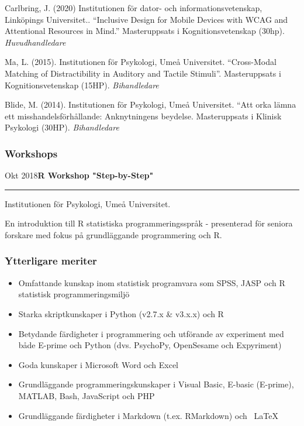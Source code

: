 \documentclass[]{article}
\providecommand{\tightlist}{%
  \setlength{\itemsep}{0pt}\setlength{\parskip}{0pt}}
\begin{document}
Carlbring, J. (2020) Institutionen för dator- och informationsvetenskap,
Linköpings Universitet.. ``Inclusive Design for Mobile Devices with WCAG
and Attentional Resources in Mind.'' Masteruppsats i Kognitionsvetenskap
(30hp). \emph{Huvudhandledare}

Ma, L. (2015). Institutionen för Psykologi, Umeå Universitet.
``Cross-Modal Matching of Distractibility in Auditory and Tactile
Stimuli''. Masteruppsats i Kognitionsvetenskap (15HP).
\emph{Bihandledare}

Blide, M. (2014). Institutionen för Psykologi, Umeå Universitet. ``Att
orka lämna ett misshandelsförhållande: Anknytningens beydelse.
Masteruppsats i Klinisk Psykologi (30HP). \emph{Bihandledare}

\hypertarget{workshops}{%
\subsubsection{Workshops}\label{workshops}}

Okt 2018\hspace{0.75cm}\textbf{R Workshop "Step-by-Step"}\vspace{1mm}

\hrule
\begin{changemargin}{2.15cm}{2.4cm}


Institutionen för Psykologi, Umeå Universitet.

En introduktion till R statistiska programmeringsspråk - presenterad för seniora forskare med fokus på grundläggande programmering och R.

\end{changemargin}

\hypertarget{ytterligare-meriter}{%
\subsubsection{Ytterligare meriter}\label{ytterligare-meriter}}

\begin{itemize}
\tightlist
\item
  Omfattande kunskap inom statistisk programvara som SPSS, JASP och R
  statistisk programmeringsmiljö
\item
  Starka skriptkunskaper i Python (v2.7.x \& v3.x.x) och R
\item
  Betydande färdigheter i programmering och utförande av experiment med
  både E-prime och Python (dvs. PsychoPy, OpenSesame och Expyriment)
\item
  Goda kunskaper i Microsoft Word och Excel
\item
  Grundläggande programmeringskunskaper i Visual Basic, E-basic
  (E-prime), MATLAB, Bash, JavaScript och PHP
\item
  Grundläggande färdigheter i Markdown (t.ex. RMarkdown) och ~LaTeX
\end{itemize}
\end{document}
